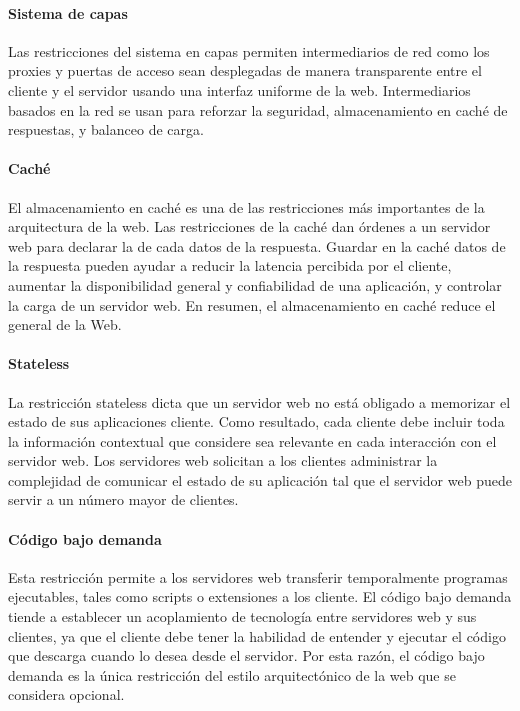 \paragraph{Sistema de capas}
\label{\detokenize{chapter_one/rest:sistema-de-capas}}
Las restricciones del sistema en capas permiten intermediarios de red como
los proxies y puertas de acceso sean desplegadas de manera transparente entre el cliente
y el servidor usando una interfaz uniforme de la web. Intermediarios basados
en la red se usan para reforzar la seguridad, almacenamiento en caché de
respuestas, y balanceo de carga.


\paragraph{Caché}
\label{\detokenize{chapter_one/rest:cache}}
El almacenamiento en caché es una de las restricciones más importantes de la
arquitectura de la web. Las restricciones de la caché dan órdenes a un servidor
web para declarar la  de cada datos de la respuesta.
Guardar en la caché datos de la respuesta pueden ayudar a reducir
la latencia percibida por el cliente, aumentar la disponibilidad
general y confiabilidad de una aplicación, y controlar la carga
de un servidor web. En resumen, el almacenamiento en caché
reduce el  general de la Web.


\paragraph{Stateless}
\label{\detokenize{chapter_one/rest:stateless}}
La restricción stateless dicta que un servidor web no está obligado
a memorizar el estado de sus aplicaciones cliente. Como resultado,
cada cliente debe incluir toda la información contextual que considere
sea relevante en cada interacción con el servidor web. Los servidores
web solicitan a los clientes administrar la complejidad de comunicar
el estado de su aplicación tal que el servidor web puede servir a un número
mayor de clientes.


\paragraph{Código bajo demanda}
\label{\detokenize{chapter_one/rest:codigo-bajo-demanda}}
Esta restricción permite a los servidores web transferir temporalmente
programas ejecutables, tales como scripts o extensiones a los cliente.
El código bajo demanda tiende a establecer un acoplamiento de tecnología
entre servidores web y sus clientes, ya que el cliente debe tener la habilidad
de entender y ejecutar el código que descarga cuando lo desea desde el servidor.
Por esta razón, el código bajo demanda es la única restricción del
estilo arquitectónico de la web que se considera opcional.


